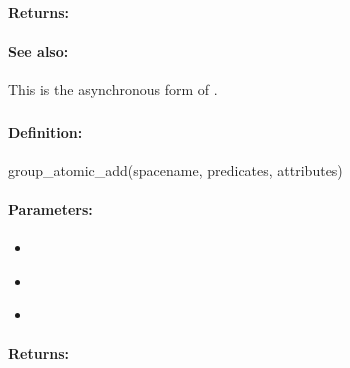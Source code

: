 \paragraph{Returns:}


\paragraph{See also:}  This is the asynchronous form of .

\pagebreak
\subsubsection{}
\label{api:ruby:group_atomic_add}


\paragraph{Definition:}
\begin{rubycode}
group_atomic_add(spacename, predicates, attributes)
\end{rubycode}

\paragraph{Parameters:}
\begin{itemize}[noitemsep]
\item {}\\

\item {}\\

\item {}\\

\end{itemize}

\paragraph{Returns:}


\pagebreak
\subsubsection{}
\label{api:ruby:async_group_atomic_add}


